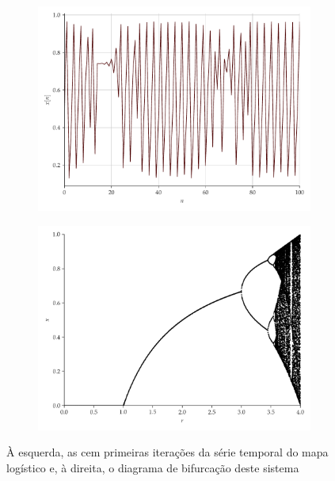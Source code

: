 \documentclass{article}
\begin{document}
\begin{figure}[H]
     \begin{subfigure}[t]{0.2\textwidth} 
         \includegraphics[scale=0.2]{serie-logistico.pdf}
     \end{subfigure}
     \centering
     \begin{subfigure}[t]{0.2\textwidth} 
         \includegraphics[scale=0.2]{mapa-logistico.png}
     \end{subfigure}
     \caption{À esquerda, as cem primeiras iterações da série temporal do mapa logístico e, à direita, o diagrama de bifurcação deste sistema}
     \label{fig:logistic}
\end{figure}
\end{document}
